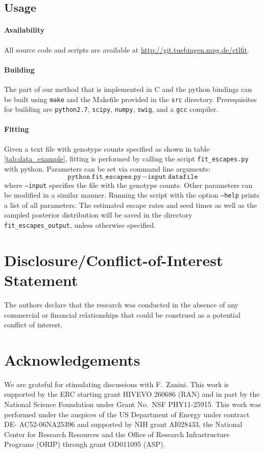 \documentclass{frontiers}
\begin{document}
\subsection{Usage}
\paragraph*{Availability}
All source code and scripts are available at
\url{http://git.tuebingen.mpg.de/ctlfit}. 

\paragraph*{Building}
The part of our method that is implemented in C and the python
bindings can be built using \texttt{make} and the Makefile provided in
the \texttt{src} directory. Prerequisites for building are
\texttt{python2.7}, \texttt{scipy}, \texttt{numpy}, \texttt{swig}, and
a \texttt{gcc} compiler. 

\paragraph*{Fitting}
Given a text file with genotype counts specified as shown in table
\ref{tab:data_example}, fitting is performed by calling the script
\texttt{fit\_escapes.py} with python. Parameters can be set via
command line arguments:
\begin{equation}
  \label{eq:command}
  \mathtt{python\ fit\_escapes.py\ \mbox{-}\mbox{-}input\ datafile}
\end{equation}
where \texttt{--input} specifies the file with the genotype
counts. Other parameters can be modified in a similar manner. Running
the script with the option \texttt{--help} prints a list of all parameters. The estimated
escape rates and seed times as well as the sampled posterior
distribution will be saved in the directory
\texttt{fit\_escapes\_output}, unless otherwise specified.

\section*{Disclosure/Conflict-of-Interest Statement}
The authors declare that the research was conducted in the absence of
any commercial or financial relationships that could be construed as a
potential conflict of interest.


\section*{Acknowledgements}
We are grateful for stimulating discussions with F.~Zanini. This work
is supported by the ERC starting grant HIVEVO 260686 (RAN) and in part by the National
Science Foundation under Grant No.~NSF PHY11-25915. This work was
performed under the auspices of the US Department of Energy under contract DE-
AC52-06NA25396 and supported by NIH grant AI028433, the National Center
for Research Resources and the Office of Research Infrastructure Programs (ORIP)
through grant OD011095 (ASP).



%
%


\end{document}
